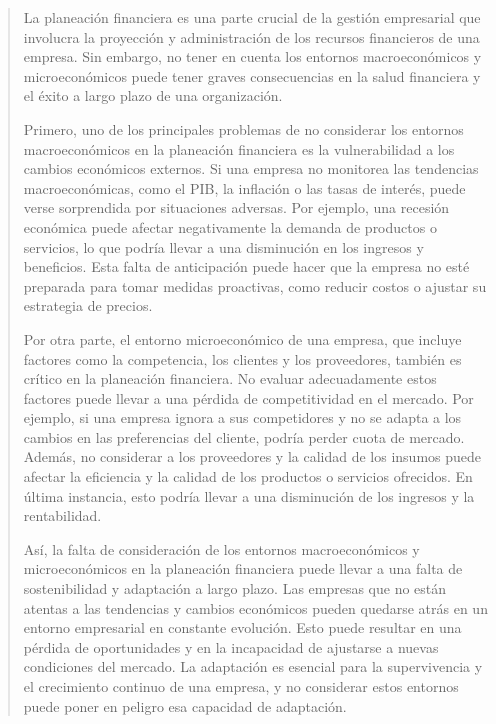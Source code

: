 \documentclass[a4paper,12pt]{article}
\begin{document}
\vspace{1cm}

\begin{quotation}
	La planeación financiera es una parte crucial de la gestión empresarial que involucra la proyección y administración de los recursos financieros de una empresa. Sin embargo, no tener en cuenta los entornos macroeconómicos y microeconómicos puede tener graves consecuencias en la salud financiera y el éxito a largo plazo de una organización.\par

	\vspace{0.5cm}

	Primero, uno de los principales problemas de no considerar los entornos macroeconómicos en la planeación financiera es la vulnerabilidad a los cambios económicos externos. Si una empresa no monitorea las tendencias macroeconómicas, como el PIB, la inflación o las tasas de interés, puede verse sorprendida por situaciones adversas. Por ejemplo, una recesión económica puede afectar negativamente la demanda de productos o servicios, lo que podría llevar a una disminución en los ingresos y beneficios. Esta falta de anticipación puede hacer que la empresa no esté preparada para tomar medidas proactivas, como reducir costos o ajustar su estrategia de precios.\par

	\vspace{0.5cm}

	Por otra parte, el entorno microeconómico de una empresa, que incluye factores como la competencia, los clientes y los proveedores, también es crítico en la planeación financiera. No evaluar adecuadamente estos factores puede llevar a una pérdida de competitividad en el mercado. Por ejemplo, si una empresa ignora a sus competidores y no se adapta a los cambios en las preferencias del cliente, podría perder cuota de mercado. Además, no considerar a los proveedores y la calidad de los insumos puede afectar la eficiencia y la calidad de los productos o servicios ofrecidos. En última instancia, esto podría llevar a una disminución de los ingresos y la rentabilidad.\par

	\vspace{0.5cm}

	Así, la falta de consideración de los entornos macroeconómicos y microeconómicos en la planeación financiera puede llevar a una falta de sostenibilidad y adaptación a largo plazo. Las empresas que no están atentas a las tendencias y cambios económicos pueden quedarse atrás en un entorno empresarial en constante evolución. Esto puede resultar en una pérdida de oportunidades y en la incapacidad de ajustarse a nuevas condiciones del mercado. La adaptación es esencial para la supervivencia y el crecimiento continuo de una empresa, y no considerar estos entornos puede poner en peligro esa capacidad de adaptación.\par


\end{quotation}
\end{document}
